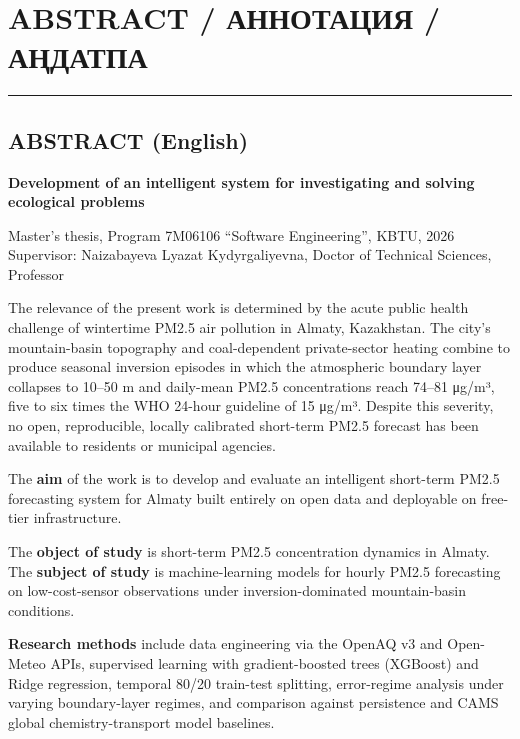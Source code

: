 \section{ABSTRACT / АННОТАЦИЯ / АҢДАТПА}\label{abstract-ux430ux43dux43dux43eux442ux430ux446ux438ux44f-ux430ux4a3ux434ux430ux442ux43fux430}

\begin{center}\rule{0.5\linewidth}{0.5pt}\end{center}

\subsection{ABSTRACT (English)}\label{abstract-english}

\textbf{Development of an intelligent system for investigating and solving ecological problems}

Master's thesis, Program 7M06106 ``Software Engineering'', KBTU, 2026\\
Supervisor: Naizabayeva Lyazat Kydyrgaliyevna, Doctor of Technical Sciences, Professor

The relevance of the present work is determined by the acute public health challenge of wintertime PM2.5 air pollution in Almaty, Kazakhstan. The city's mountain-basin topography and coal-dependent private-sector heating combine to produce seasonal inversion episodes in which the atmospheric boundary layer collapses to 10--50 m and daily-mean PM2.5 concentrations reach 74--81 μg/m³, five to six times the WHO 24-hour guideline of 15 μg/m³. Despite this severity, no open, reproducible, locally calibrated short-term PM2.5 forecast has been available to residents or municipal agencies.

The \textbf{aim} of the work is to develop and evaluate an intelligent short-term PM2.5 forecasting system for Almaty built entirely on open data and deployable on free-tier infrastructure.

The \textbf{object of study} is short-term PM2.5 concentration dynamics in Almaty. The \textbf{subject of study} is machine-learning models for hourly PM2.5 forecasting on low-cost-sensor observations under inversion-dominated mountain-basin conditions.

\textbf{Research methods} include data engineering via the OpenAQ v3 and Open-Meteo APIs, supervised learning with gradient-boosted trees (XGBoost) and Ridge regression, temporal 80/20 train-test splitting, error-regime analysis under varying boundary-layer regimes, and comparison against persistence and CAMS global chemistry-transport model baselines.

